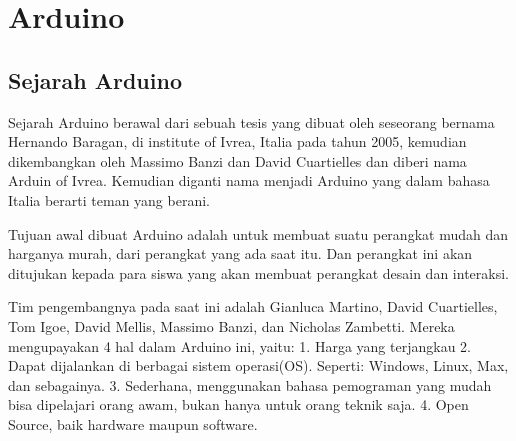 \section{Arduino}
\subsection{Sejarah Arduino}
	Sejarah Arduino berawal dari sebuah tesis yang dibuat oleh seseorang bernama Hernando Baragan, di institute of Ivrea, Italia pada tahun 2005, kemudian dikembangkan oleh Massimo Banzi dan David Cuartielles dan diberi nama Arduin of Ivrea. Kemudian diganti nama menjadi Arduino yang dalam bahasa Italia berarti teman yang berani.

	Tujuan awal dibuat Arduino adalah untuk membuat suatu perangkat mudah dan harganya murah, dari perangkat yang ada saat itu. Dan perangkat ini akan ditujukan kepada para siswa yang akan membuat perangkat desain dan interaksi.

	Tim pengembangnya pada saat ini adalah Gianluca Martino, David Cuartielles, Tom Igoe, David Mellis, Massimo Banzi, dan Nicholas Zambetti. Mereka mengupayakan 4 hal dalam Arduino ini, yaitu:
	1.	Harga yang terjangkau
	2.	Dapat dijalankan di berbagai sistem operasi(OS). Seperti: Windows, Linux, Max, dan sebagainya.
	3.	Sederhana, menggunakan bahasa pemograman yang mudah bisa dipelajari orang awam, bukan hanya untuk orang teknik saja.
	4.	Open Source, baik hardware maupun software.
